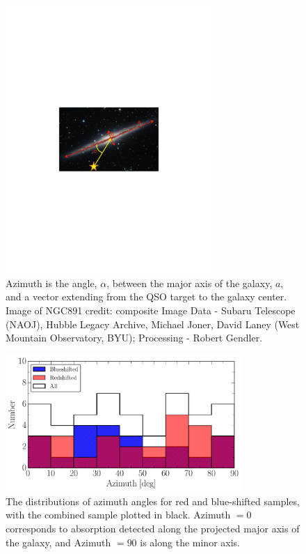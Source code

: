 \begin{figure}[t!]
        \centering
        \includegraphics[width=0.7\textwidth]{Chap3/figures/fig11.pdf}
        \caption{\small{Azimuth is the angle, $\alpha$, between the major axis of the galaxy, $a$, and a vector extending from the QSO target to the galaxy center. Image of NGC891 credit: composite Image Data - Subaru Telescope (NAOJ), Hubble Legacy Archive, Michael Joner, David Laney (West Mountain Observatory, BYU); Processing - Robert Gendler.}}
        \label{azimuth_illustration}
        \vspace{5pt}
\end{figure} 

\begin{figure}[t!]
        \centering
        \includegraphics[width=0.8\textwidth]{Chap3/figures/fig12.pdf}
        \caption{\small{The distributions of azimuth angles for red and blue-shifted samples, with the combined sample plotted in black. Azimuth $= 0$ corresponds to absorption detected along the projected major axis of the galaxy, and Azimuth $= 90$ is along the minor axis.}}
        \label{azimuth_dist}
\end{figure}


